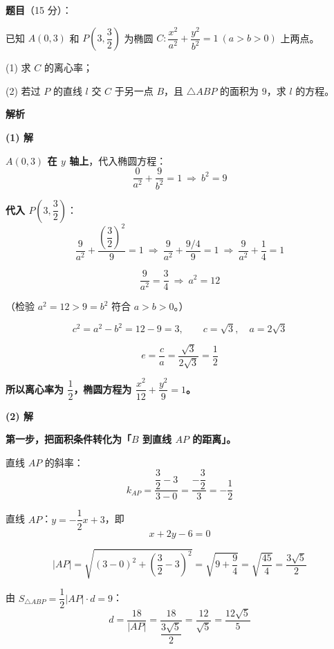 \begin{answer}

\textbf{题目}（15 分）：

已知 $A(0,3)$ 和 $P\left(3,\dfrac32\right)$ 为椭圆 $C:\dfrac{x^{2}}{a^{2}}+\dfrac{y^{2}}{b^{2}}=1\ (a>b>0)$ 上两点。

  (1) 求 $C$ 的离心率；

  (2) 若过 $P$ 的直线 $l$ 交 $C$ 于另一点 $B$，且 $\triangle ABP$ 的面积为 $9$，求 $l$ 的方程。

\textbf{解析}

\par\medskip

\textbf{(1) 解}

\textbf{$A(0,3)$ 在 $y$ 轴上}，代入椭圆方程：
\nopagebreak[4]
\[\frac{0}{a^{2}}+\frac{9}{b^{2}}=1\ \Longrightarrow\ b^{2}=9\]

\textbf{代入 $P\left(3,\dfrac32\right)$}：
\nopagebreak[4]
\[\frac9{a^{2}}+\frac{\left(\dfrac32\right)^{2}}9=1\ \Longrightarrow\ \frac9{a^{2}}+\frac{9/4}9=1\ \Longrightarrow\ \frac9{a^{2}}+\frac14=1\]

\nopagebreak[4]
\[\frac9{a^{2}}=\frac34\ \Longrightarrow\ a^{2}=12\]

（检验 $a^{2}=12>9=b^{2}$  符合 $a>b>0$。）

\nopagebreak[4]
\[c^{2}=a^{2}-b^{2}=12-9=3,\qquad c=\sqrt3,\quad a=2\sqrt3\]

\nopagebreak[4]
\[e=\frac ca=\frac{\sqrt3}{2\sqrt3}=\frac12\]

\textbf{所以离心率为 $\dfrac12$，椭圆方程为 $\dfrac{x^{2}}{12}+\dfrac{y^{2}}9=1$。}

\par\medskip

\textbf{(2) 解}

\textbf{第一步，把面积条件转化为「$B$ 到直线 $AP$ 的距离」。}

直线 $AP$ 的斜率：
\nopagebreak[4]
\[k_{AP}=\frac{\dfrac32-3}{3-0}=\frac{-\dfrac32}3=-\frac12\]

直线 $AP$：$y=-\dfrac12x+3$，即
\nopagebreak[4]
\[x+2y-6=0\]

\nopagebreak[4]
\[|AP|=\sqrt{(3-0)^{2}+\left(\frac32-3\right)^{2}}=\sqrt{9+\frac94}=\sqrt{\frac{45}4}=\frac{3\sqrt5}2\]

由 $S_{\triangle ABP}=\dfrac12|AP|\cdot d=9$：
\nopagebreak[4]
\[d=\frac{18}{|AP|}=\frac{18}{\dfrac{3\sqrt5}2}=\frac{12}{\sqrt5}=\frac{12\sqrt5}5\]


\end{answer}
